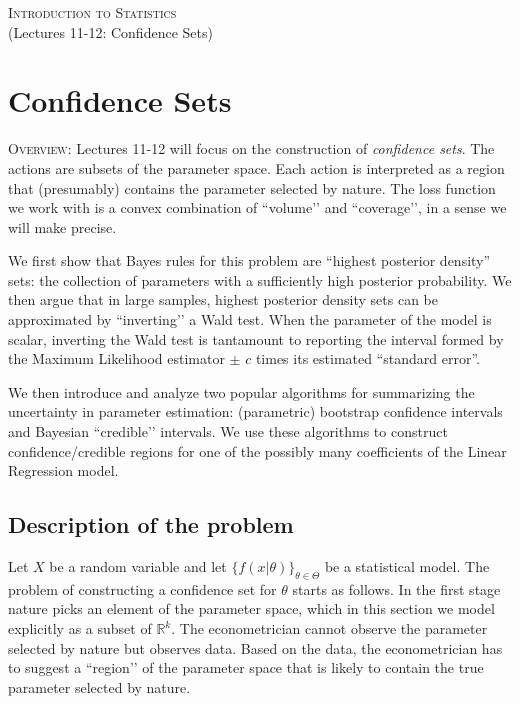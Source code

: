\documentclass[11pt]{article} %
\begin{document}
\onehalfspace

\vspace*{\fill}
\begingroup
\centering

\Large {\scshape Introduction to Statistics}\\

(Lectures 11-12: Confidence Sets)

\endgroup
\vspace*{\fill}

\newpage


\section{Confidence Sets}

{\scshape Overview:} \noindent Lectures 11-12 will focus on the construction of \emph{confidence sets}. The actions are subsets of the parameter space. Each action is interpreted as a region that (presumably) contains the parameter selected by nature. The loss function we work with is a convex combination of ``volume’’ and ``coverage’’, in a sense we will make precise.

We first show that Bayes rules for this problem are ``highest posterior density” sets: the collection of parameters with a sufficiently high posterior probability. We then argue that in large samples, highest posterior density sets can be approximated by ``inverting’’ a Wald test. When the parameter of the model is scalar, inverting the Wald test is tantamount to reporting the interval formed by the Maximum Likelihood estimator $\pm$ $c$ times its estimated “standard error”.

We then introduce and analyze two popular algorithms for summarizing the uncertainty in parameter estimation: (parametric) bootstrap confidence intervals and Bayesian ``credible’’ intervals. We use these algorithms to construct confidence/credible regions for one of the possibly many coefficients of the Linear Regression model. 

\subsection{Description of the problem} 

Let $X$ be a random variable and let $\{f(x | \theta)\}_{\theta \in \Theta}$ be a statistical model. The problem of constructing a confidence set for $\theta$ starts as follows. In the first stage nature picks an element of the parameter space, which in this section we model explicitly as a subset of $\mathbb{R}^{k}$. The econometrician cannot observe the parameter selected by nature but observes data. Based on the data, the econometrician has to suggest a ``region’’ of the parameter space that is likely to contain the true parameter selected by nature. 
\end{document}

